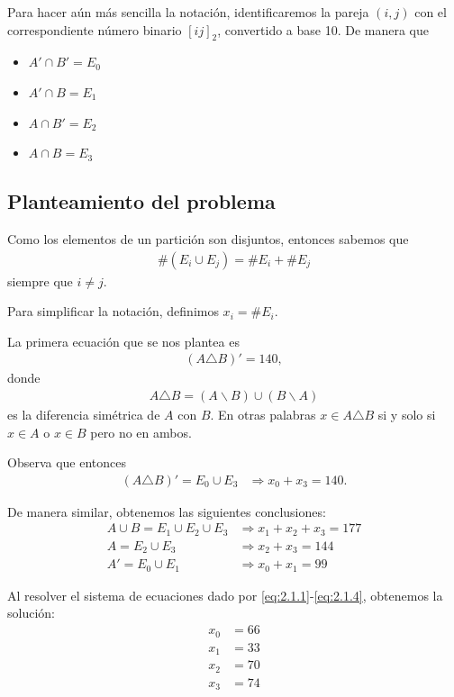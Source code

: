 Para hacer aún más sencilla la notación, identificaremos la pareja $ (i,j) $ con el correspondiente número binario $ [ij]_{2} $, convertido a base 10. De manera que 
\begin{itemize}
	\item $ A' \cap B' = E_{0}$
	\item $ A'  \cap B = E_{1}$
	\item $ A \cap B'  = E_{2}$
	\item $ A  \cap B  = E_{3}$
\end{itemize}

\subsection{Planteamiento del problema}

Como los elementos de un partición son disjuntos, entonces sabemos que 
\begin{align}
	\#\left(E_i\cup E_j\right) = \#E_i+\#E_j
\end{align}
siempre que $ i\neq j $.

Para simplificar la notación, definimos $ x_i=\# E_i. $

La primera ecuación que se nos plantea es
\begin{align}
	\left(A \triangle B \right)'=140,
\end{align}
donde 
\begin{align}
	A\triangle B = (A\backslash B)\cup(B\backslash A)
\end{align}
es la diferencia simétrica de $ A $ con $ B $. En otras palabras $ x\in A \triangle B $ si y solo si $ x\in A $ o $ x \in B $ pero no en ambos.

Observa que entonces
\begin{align}
	\label{eq:2.1.1}
	\left(A\triangle B\right)' = E_0 \cup E_3 &
	\Rightarrow
	x_0 + x_3 = 140.
\end{align}

De manera similar, obtenemos las siguientes conclusiones:
\begin{align}
	\label{eq:2.1.2}
	A\cup B = E_1\cup E_2 \cup E_3 &
	\Rightarrow x_1+x_2+x_3=177 \\
	\label{eq:2.1.3}
	A = E_2 \cup E_3 &
	\Rightarrow x_2+x_3 = 144 \\
	\label{eq:2.1.4}
	A' = E_0 \cup E_1 &
	\Rightarrow x_0+x_1 =99
\end{align}

Al resolver el sistema de ecuaciones dado por  \ref{eq:2.1.1}-\ref{eq:2.1.4}, obtenemos la solución:
\begin{align}
	x_0 &= 66 \\
	x_1 &= 33 \\
	x_2 &= 70 \\
	x_3 &= 74
\end{align}

